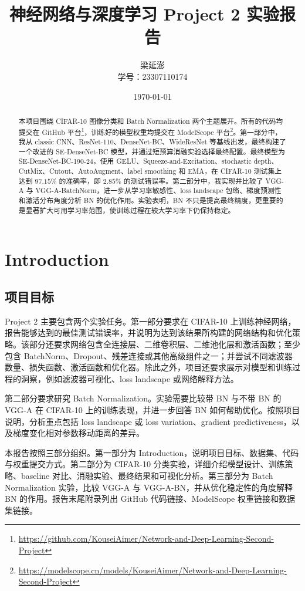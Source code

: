 \documentclass[UTF8,a4paper,11pt]{ctexart}
\title{\textbf{神经网络与深度学习 Project 2 实验报告}}
\author{梁延澎\\学号：23307110174}
\date{\today}
\begin{document}
\maketitle

\begin{abstract}
本项目围绕 CIFAR-10 图像分类和 Batch Normalization 两个主题展开。所有的代码均提交在 GitHub 平台\footnote{\url{https://github.com/KouseiAimer/Network-and-Deep-Learning-Second-Project}}，训练好的模型权重均提交在 ModelScope 平台\footnote{\url{https://modelscope.cn/models/KouseiAimer/Network-and-Deep-Learning-Second-Project}}。第一部分中，我从 classic CNN、ResNet-110、DenseNet-BC、WideResNet 等基线出发，最终构建了一个改进的 SE-DenseNet-BC 模型，并通过短预算消融实验选择最终配置。最终模型为 SE-DenseNet-BC-190-24，使用 GELU、Squeeze-and-Excitation、stochastic depth、CutMix、Cutout、AutoAugment、label smoothing 和 EMA，在 CIFAR-10 测试集上达到 $97.15\%$ 的准确率，即 $2.85\%$ 的测试错误率。第二部分中，我实现并比较了 VGG-A 与 VGG-A-BatchNorm，进一步从学习率敏感性、loss landscape 包络、梯度预测性和激活分布角度分析 BN 的优化作用。实验表明，BN 不只是提高最终精度，更重要的是显著扩大可用学习率范围，使训练过程在较大学习率下仍保持稳定。
\end{abstract}

\tableofcontents
\newpage

\section{Introduction}

\subsection{项目目标}

Project 2 主要包含两个实验任务。第一部分要求在 CIFAR-10 上训练神经网络，报告能够达到的最佳测试错误率，并说明为达到该结果所构建的网络结构和优化策略。该部分还要求网络包含全连接层、二维卷积层、二维池化层和激活函数；至少包含 BatchNorm、Dropout、残差连接或其他高级组件之一；并尝试不同滤波器数量、损失函数、激活函数和优化器。除此之外，项目还要求展示对模型和训练过程的洞察，例如滤波器可视化、loss landscape 或网络解释方法。

第二部分要求研究 Batch Normalization。实验需要比较带 BN 与不带 BN 的 VGG-A 在 CIFAR-10 上的训练表现，并进一步回答 BN 如何帮助优化。按照项目说明，分析重点包括 loss landscape 或 loss variation、gradient predictiveness，以及梯度变化相对参数移动距离的差异。

本报告按照三部分组织。第一部分为 Introduction，说明项目目标、数据集、代码与权重提交方式。第二部分为 CIFAR-10 分类实验，详细介绍模型设计、训练策略、baseline 对比、消融实验、最终结果和可视化分析。第三部分为 Batch Normalization 实验，比较 VGG-A 与 VGG-A-BN，并从优化稳定性的角度解释 BN 的作用。报告末尾附录列出 GitHub 代码链接、ModelScope 权重链接和数据集链接。
\end{document}
